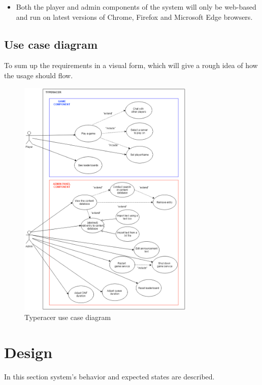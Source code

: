 \documentclass[titlepage]{article}
\begin{document}
\begin{itemize}
	\item Both the player and admin components of the system will only be web-based and run on latest versions of Chrome, Firefox and Microsoft Edge browsers.
\end{itemize}

\newpage

\subsection{Use case diagram}

To sum up the requirements in a visual form, which will give a rough idea of how the usage should flow.

\begin{figure}[ht]
	\centering
	\includegraphics[width=0.75\textwidth]{use_case_diagram.png}
	\caption{Typeracer use case diagram}
	\label{fig:usecase-diag}
\end{figure}

\newpage

\section{Design}

In this section system's behavior and expected states are described.
\end{document}
